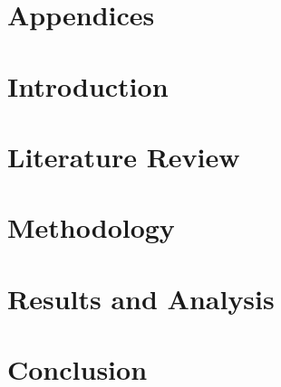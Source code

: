 \documentclass[a4paper,12pt]{classes/uuthesis}
\numberwithin{figure}{chapter}
\numberwithin{table}{chapter}
\begin{document}
\chapter*{\centering Appendices}


\newpage
{}
\chapter[Introduction]{Introduction}


\chapter{Literature Review}


\chapter{Methodology} 


\chapter{Results and Analysis}


\chapter{Conclusion}


\renewcommand\bibname{References}




\end{document}

